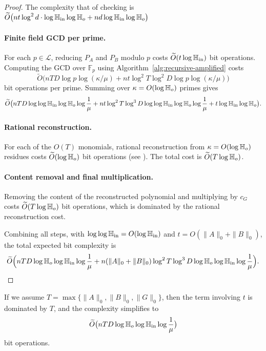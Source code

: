 \documentclass{article}
\numberwithin{equation}{section}
\begin{document}
\begin{proof}
The  complexity that of checking is $\widetilde{O}\bigl( n t \log^2 d \cdot \log \mathbb{H}_{\rm in} \log\mathbb{H}_{o} + n d \log \mathbb{H}_{\rm in} \log\mathbb{H}_{o} \bigr)$

\paragraph{Finite field GCD per prime.}
For each \(p \in \mathcal{L}\), reducing \(P_A\) and \(P_B\) modulo \(p\) costs \(\widetilde{O}(t \log \mathbb{H}_{\rm in})\) bit operations. Computing the GCD over \(\mathbb{F}_p\) using Algorithm~\ref{alg:recursive-amplified} costs
\[
\widetilde{O}\bigl( nTD\log p\log(\kappa/\mu) + n t \log^2 T \log^2 D\log p\log(\kappa/\mu) \bigr)
\]
bit operations per prime. Summing over \(\kappa = O(\log \mathbb{H}_{o})\) primes gives
\[
\widetilde{O}\bigl( nTD \log\log\mathbb{H}_{\rm in}\log \mathbb{H}_{o}\log\frac{1}{\mu} + n t \log^2 T \log^3 D \log\log\mathbb{H}_{\rm in}\log \mathbb{H}_{o}\log\frac{1}{\mu} + t \log \mathbb{H}_{\rm in} \log \mathbb{H}_{o} \bigr).
\]

\paragraph{Rational reconstruction.}
For each of the \(O(T)\) monomials, rational reconstruction from \(\kappa = O(\log \mathbb{H}_{o})\) residues costs \(\widetilde{O}(\log \mathbb{H}_{o})\) bit operations (see \cite{WangPan2003,monagan2004maximal}). The total cost is \(\widetilde{O}(T \log \mathbb{H}_{o})\).

\paragraph{Content removal and final multiplication.}
Removing the content of the reconstructed polynomial and multiplying by \(c_G\) costs \(\widetilde{O}(T \log \mathbb{H}_{o})\) bit operations, which is dominated by the rational reconstruction cost.

Combining all steps, with $\log\log\mathbb{H}_{\rm in} = O(\log\mathbb{H}_{\rm in})$ and $t = O(\|A\|_0+\|B\|_0)$, the total expected bit complexity is
\[
\widetilde{O}\Bigl(
nTD\log\mathbb{H}_{o}\log\mathbb{H}_{\rm in}\log\frac{1}{\mu}
+ n(\|A\|_0+\|B\|_0) \log^2 T \log^3 D \log \mathbb{H}_{o} \log \mathbb{H}_{\rm in}\log\frac{1}{\mu}
\Bigr).
\]
\end{proof}

\begin{remark}
If we assume \(T = \max\{\|A\|_0, \|B\|_0, \|G\|_0\}\), then the term involving \(t\) is dominated by \(T\), and the complexity simplifies to
\[
\widetilde{O}\bigl( n T D \log \mathbb{H}_{o} \log \mathbb{H}_{\rm in} \log\frac{1}{\mu} \bigr)
\]
bit operations.
\end{remark}
\end{document}
